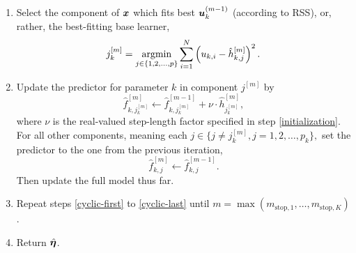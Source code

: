 \begin{algorithm}
\begin{enumerate}
    \item Select the component of $\bm{x}$ which fits best $\bm{u}^{(m-1)}_k$ (according to RSS), or, rather, the best-fitting base learner,
        \begin{equation}
            j_k^{[m]}=\operatorname*{argmin}_{j\in\{1,2,\ldots,p\}}\sum_{i=1}^N \left(u_{k,i}-\hat{h}_{k,j}^{[m]}\right)^2.
        \end{equation}
    \item\label{cyclic-last} Update the predictor for parameter $k$ in component $j^{[m]}$ by
        \begin{equation}
            \hat{f}_{k,j_k^{[m]}}^{[m]}\gets\hat{f}_{k,j_k^{[m]}}^{[m-1]}+\nu\cdot\hat{h}_{j_k^{[m]}}^{[m]},
        \end{equation}
        where $\nu$ is the real-valued step-length factor specified in step \ref{initialization}. For all other components,
        meaning each $j\in\{j\neq j_k^{[m]},j=1,2,\ldots,p_k\},$ set the predictor to the one from the previous iteration,
        \begin{equation}
            \hat{f}_{k,j}^{[m]}\gets\hat{f}_{k,j}^{[m-1]}.
        \end{equation}
        Then update the full model thus far.
    \item Repeat steps \ref{cyclic-first} to \ref{cyclic-last} until $m=\max(m_{\text{stop},1},\ldots,m_{\text{stop},K})$.
    \item Return $\hat{\boldsymbol{\eta}}$.
\end{enumerate}
\end{algorithm}

